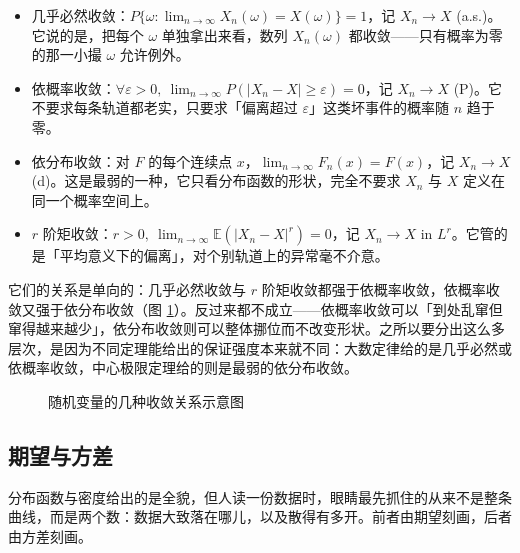 \documentclass[UTF8]{ctexbook}
\begin{document}
\begin{itemize}
  \item 几乎必然收敛：$P\{\omega:\lim_{n\to\infty}X_n(\omega)=X(\omega)\}=1$，记 $X_n\to X$ (a.s.)。它说的是，把每个 $\omega$ 单独拿出来看，数列 $X_n(\omega)$ 都收敛——只有概率为零的那一小撮 $\omega$ 允许例外。
  \item 依概率收敛：$\forall\varepsilon>0,\ \lim_{n\to\infty}P(|X_n-X|\ge\varepsilon)=0$，记 $X_n\to X$ (P)。它不要求每条轨道都老实，只要求「偏离超过 $\varepsilon$」这类坏事件的概率随 $n$ 趋于零。
  \item 依分布收敛：对 $F$ 的每个连续点 $x$，$\lim_{n\to\infty}F_n(x)=F(x)$，记 $X_n\to X$ (d)。这是最弱的一种，它只看分布函数的形状，完全不要求 $X_n$ 与 $X$ 定义在同一个概率空间上。
  \item $r$ 阶矩收敛：$r>0,\ \lim_{n\to\infty}\mathbb{E}(|X_n-X|^r)=0$，记 $X_n\to X$ in $L^r$。它管的是「平均意义下的偏离」，对个别轨道上的异常毫不介意。
\end{itemize}

它们的关系是单向的：几乎必然收敛与 $r$ 阶矩收敛都强于依概率收敛，依概率收敛又强于依分布收敛（图 \ref{fig:conv}）。反过来都不成立——依概率收敛可以「到处乱窜但窜得越来越少」，依分布收敛则可以整体挪位而不改变形状。之所以要分出这么多层次，是因为不同定理能给出的保证强度本来就不同：大数定律给的是几乎必然或依概率收敛，中心极限定理给的则是最弱的依分布收敛。

\begin{figure}[htbp]
  \centering
  \caption{随机变量的几种收敛关系示意图}
  \label{fig:conv}
\end{figure}

\subsection{期望与方差}

分布函数与密度给出的是全貌，但人读一份数据时，眼睛最先抓住的从来不是整条曲线，而是两个数：数据大致落在哪儿，以及散得有多开。前者由期望刻画，后者由方差刻画。
\end{document}
